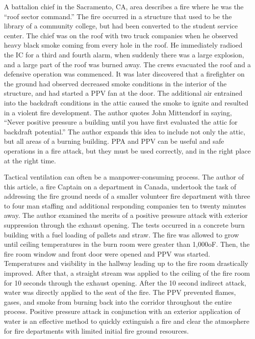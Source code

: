 \documentclass{article}
\begin{document}
\begin{appendices}
A battalion chief in the Sacramento, CA, area describes a fire where he was the “roof sector command.” The fire occurred in a structure that used to be the library of a community college, but had been converted to the student service center. The chief was on the roof with two truck companies when he observed heavy black smoke coming from every hole in the roof. He immediately radioed the IC for a third and fourth alarm, when suddenly there was a large explosion, and a large part of the roof was burned away. The crews evacuated the roof and a defensive operation was commenced. It was later discovered that a firefighter on the ground had observed decreased smoke conditions in the interior of the structure, and had started a PPV fan at the door. The additional air entrained into the backdraft conditions in the attic caused the smoke to ignite and resulted in a violent fire development. The author quotes John Mittendorf in saying, “Never positive pressure a building until you have first evaluated the attic for backdraft potential.” The author expands this idea to include not only the attic, but all areas of a burning building. PPA and PPV can be useful and safe operations in a fire attack, but they must be used correctly, and in the right place at the right time.\cite{UnderstandPPAChallenge}

Tactical ventilation can often be a manpower-consuming process. The author of this article, a fire Captain on a department in Canada, undertook the task of addressing the fire ground needs of a smaller volunteer fire department with three to four man staffing and additional responding companies ten to twenty minutes away. The author examined the merits of a positive pressure attack with exterior suppression through the exhaust opening. The tests occurred in a concrete burn building with a fuel loading of pallets and straw. The fire was allowed to grow until ceiling temperatures in the burn room were greater than 1,000oF. Then, the fire room window and front door were opened and PPV was started. Temperatures and visibility in the hallway leading up to the fire room drastically improved. After that, a straight stream was applied to the ceiling of the fire room for 10 seconds through the exhaust opening. After the 10 second indirect attack, water was directly applied to the seat of the fire. The PPV prevented flames, gases, and smoke from burning back into the corridor throughout the entire process. Positive pressure attack in conjunction with an exterior application of water is an effective method to quickly extinguish a fire and clear the atmosphere for fire departments with limited initial fire ground resources.\cite{CambellExtfire}


\end{appendices}
\end{document}
